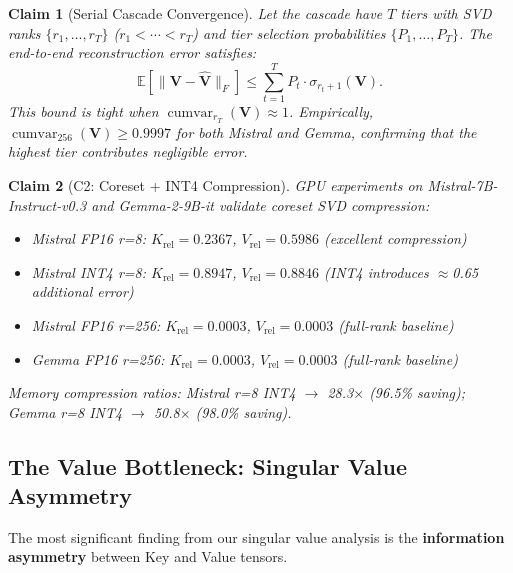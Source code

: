 \documentclass[11pt, a4paper, oneside]{article}
\newtheorem{claim}{Claim}
\theoremstyle{myplain}
\theoremstyle{mydefinition}
\theoremstyle{myremark}
\DeclareMathOperator{\cumvar}{cumvar}
\begin{document}
\begin{claim}[Serial Cascade Convergence]
Let the cascade have $T$ tiers with SVD ranks $\{r_1, \ldots, r_T\}$ ($r_1 < \cdots < r_T$) and tier selection probabilities $\{P_1, \ldots, P_T\}$. The end-to-end reconstruction error satisfies:
\begin{equation}
    \mathbb{E}[\|\mathbf{V} - \mathbf{\hat{V}}\|_F] \leq \sum_{t=1}^{T} P_t \cdot \sigma_{r_t+1}(\mathbf{V}).
    \tag{4}
\end{equation}
This bound is tight when $\cumvar_{r_T}(\mathbf{V}) \approx 1$. Empirically, $\cumvar_{256}(\mathbf{V}) \geq 0.9997$ for both Mistral and Gemma, confirming that the highest tier contributes negligible error.
\label{claim:cascade_convergence}
\end{claim}

\begin{claim}[C2: Coreset + INT4 Compression]
    GPU experiments on Mistral-7B-Instruct-v0.3 and Gemma-2-9B-it validate coreset SVD compression:
    
    \begin{itemize}
        \item Mistral FP16 r=8: $K_{\text{rel}} = 0.2367$, $V_{\text{rel}} = 0.5986$ (excellent compression)
        \item Mistral INT4 r=8: $K_{\text{rel}} = 0.8947$, $V_{\text{rel}} = 0.8846$ (INT4 introduces $\approx$0.65 additional error)
        \item Mistral FP16 r=256: $K_{\text{rel}} = 0.0003$, $V_{\text{rel}} = 0.0003$ (full-rank baseline)
        \item Gemma FP16 r=256: $K_{\text{rel}} = 0.0003$, $V_{\text{rel}} = 0.0003$ (full-rank baseline)
    \end{itemize}
    
    Memory compression ratios: Mistral r=8 INT4 $\rightarrow$ 28.3$\times$ (96.5\% saving); Gemma r=8 INT4 $\rightarrow$ 50.8$\times$ (98.0\% saving).
    \label{claim:compression}
\end{claim}

\subsection{The Value Bottleneck: Singular Value Asymmetry}

The most significant finding from our singular value analysis is the \textbf{information asymmetry} between Key and Value tensors.
\end{document}
